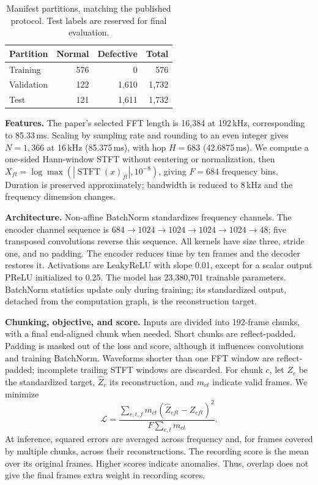 \documentclass[10pt,letterpaper]{article}
\makeatletter
\renewcommand\section{\@startsection{section}{1}{\z@}{-2.0ex plus -.5ex}{.8ex}{\large\bfseries}}
\makeatother
\begin{document}
\begin{table}[ht]
\centering\small
\begin{tabular}{lrrr}
\toprule
Partition & Normal & Defective & Total\\
\midrule
Training & 576 & 0 & 576\\
Validation & 122 & 1,610 & 1,732\\
Test & 121 & 1,611 & 1,732\\
\bottomrule
\end{tabular}
\caption{Manifest partitions, matching the published protocol. Test labels are
reserved for final evaluation.}\label{tab:data}
\end{table}

\section{Method and implementation choices}
\textbf{Features.}
The paper's selected FFT length is 16,384 at 192\,kHz, corresponding to
85.33\,ms. Scaling by sampling rate and rounding to an even integer gives
$N=1{,}366$ at 16\,kHz (85.375\,ms), with hop $H=683$ (42.6875\,ms).
We compute a one-sided Hann-window STFT without centering or normalization,
then $X_{ft}=\log\max(|\operatorname{STFT}(x)_{ft}|,10^{-8})$,
giving $F=684$ frequency bins. Duration is preserved approximately; bandwidth
is reduced to 8\,kHz and the frequency dimension changes.

\textbf{Architecture.}
Non-affine BatchNorm standardizes frequency channels. The encoder channel
sequence is $684\!\to\!1024\!\to\!1024\!\to\!1024\!\to\!1024\!\to\!48$;
five transposed convolutions reverse this sequence. All kernels have size
three, stride one, and no padding. The encoder reduces time by ten frames and
the decoder restores it. Activations are LeakyReLU with slope 0.01, except for
a scalar output PReLU initialized to 0.25. The model has 23,380,701 trainable
parameters. BatchNorm statistics update only during training; its standardized
output, detached from the computation graph, is the reconstruction target.

\textbf{Chunking, objective, and score.}
Inputs are divided into 192-frame chunks, with a final end-aligned chunk when
needed. Short chunks are reflect-padded. Padding is masked out of the loss and
score, although it influences convolutions and training BatchNorm. Waveforms
shorter than one FFT window are reflect-padded; incomplete trailing STFT
windows are discarded. For chunk $c$, let $Z_c$ be the standardized target,
$\widehat Z_c$ its reconstruction, and $m_{ct}$ indicate valid frames. We minimize
\begin{equation}
\mathcal L=
\frac{\sum_{c,t,f}m_{ct}(\widehat Z_{cft}-Z_{cft})^2}
{F\sum_{c,t}m_{ct}}.
\end{equation}
At inference, squared errors are averaged across frequency and, for frames
covered by multiple chunks, across their reconstructions. The recording score
is the mean over its original frames. Higher scores indicate anomalies.
Thus, overlap does not give the final frames extra weight in recording scores.
\end{document}
